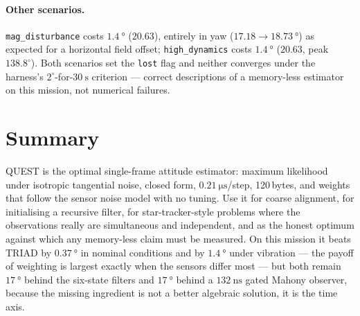 \paragraph{Other scenarios.} \texttt{mag\_disturbance} costs $\SI{1.4}{\degree}$ ($20.63$), entirely
in yaw ($17.18\to\SI{18.73}{\degree}$) as expected for a horizontal field offset;
\texttt{high\_dynamics} costs $\SI{1.4}{\degree}$ ($20.63$, peak $138.8^\circ$). Both scenarios set
the \texttt{lost} flag and neither converges under the harness's $2^\circ$-for-$\SI{30}{\second}$
criterion --- correct descriptions of a memory-less estimator on this mission, not numerical
failures.

\section{Summary}
QUEST is the optimal single-frame attitude estimator: maximum likelihood under isotropic tangential
noise, closed form, $\SI{0.21}{\micro\second}$/step, 120\,bytes, and weights that follow the sensor
noise model with no tuning. Use it for coarse alignment, for initialising a recursive filter, for
star-tracker-style problems where the observations really are simultaneous and independent, and as
the honest optimum against which any memory-less claim must be measured. On this mission it beats
TRIAD by $\SI{0.37}{\degree}$ in nominal conditions and by $\SI{1.4}{\degree}$ under vibration ---
the payoff of weighting is largest exactly when the sensors differ most --- but both remain
$\SI{17}{\degree}$ behind the six-state filters and $\SI{17}{\degree}$ behind a
$\SI{132}{\nano\second}$ gated Mahony observer, because the missing ingredient is not a better
algebraic solution, it is the time axis.
